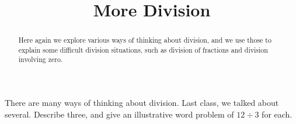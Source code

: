 \documentclass{ximera}
\title{More Division}
\begin{document}
\begin{abstract}
Here again we explore various ways of thinking about division, and we use those to explain some difficult division situations, such as division of fractions and division involving zero.
\end{abstract}
\maketitle


%
%
%

\begin{problem}[5in]
There are many ways of thinking about division.  Last class, we talked about several.  Describe three, and give an illustrative word problem of $12\div 3$ for each. 
\begin{freeResponse}
\end{freeResponse}
\end{problem}
\end{document}
